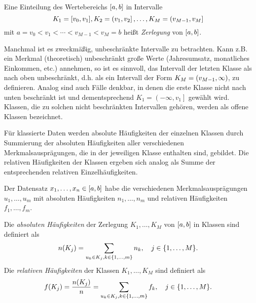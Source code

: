 \documentclass{lecture}
\begin{document}
    \begin{definition}
        Eine Einteilung des Wertebereichs \(\brackets*{a, b}\) in Intervalle
        \[
            K_1 = \brackets*{v_0, v_1}, K_2 = \left(v_1, v_2\right], \ldots, K_M = \left(v_{M - 1}, v_M\right]
        \]
        mit \(a = v_0 < v_1 < \cdots < v_{M - 1} < v_M = b\) heißt \emph{Zerlegung} von \(\brackets*{a, b}\).
    \end{definition}

    Manchmal ist es zweckmäßig, unbeschränkte Intervalle zu betrachten.
    Kann z.B. ein Merkmal (theoretisch) unbeschränkt große Werte (Jahresumsatz, monatliches Einkommen, etc.) annehmen, so ist es sinnvoll, das Intervall der letzten Klasse als nach oben unbeschränkt, d.h. als ein Intervall der Form \(K_M = \parentheses*{v_{M - 1}, \infty}\), zu definieren.
    Analog sind auch Fälle denkbar, in denen die erste Klasse nicht nach unten beschränkt ist und dementsprechend \(K_1 = \left(-\infty, v_1\right]\) gewählt wird.
    Klassen, die zu solchen nicht beschränkten Intervallen gehören, werden als offene Klassen bezeichnet.

    Für klassierte Daten werden absolute Häufigkeiten der einzelnen Klassen durch Summierung der absoluten Häufigkeiten aller verschiedenen Merkmalsausprägungen, die in der jeweiligen Klasse enthalten sind, gebildet. Die relativen Häufigkeiten der Klassen ergeben sich analog als Summe der entsprechenden relativen Einzelhäufigkeiten.

    \begin{definition}
        Der Datensatz \(x_1, \ldots, x_n \in \brackets*{a, b}\) habe die verschiedenen Merkmalsausprägungen \(u_1, \ldots, u_m\) mit absoluten Häufigkeiten \(n_1, \ldots, n_m\) und relativen Häufigkeiten \(f_1, \ldots, f_m\).

        Die \emph{absoluten Häufigkeiten} der Zerlegung \(K_1, \ldots, K_M\) von \(\brackets*{a, b}\) in Klassen sind definiert als
        \[
            n\parentheses*{K_j} = \sum_{u_k \in K_j, k \in \braces*{1, \ldots, m}}n_k, \quad j \in \braces*{1, \ldots, M}.
        \]
        Die \emph{relativen Häufigkeiten} der Klassen \(K_1, \ldots, K_M\) sind definiert als
        \[
            f\parentheses*{K_j} = \frac{n\parentheses*{K_j}}{n} = \sum_{u_k \in K_j, k \in \braces*{1, \ldots, m}}f_k, \quad j \in \braces*{1, \ldots, M}.
        \]
    \end{definition}
\end{document}
